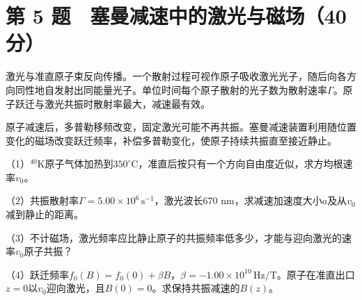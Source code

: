 \documentclass[12pt,a4paper,fontset=fandol]{ctexart}
\begin{document}
\clearpage

\section{第 5
题　塞曼减速中的激光与磁场（40分）}\label{ux7b2c-5-ux9898-ux585eux66fcux51cfux901fux4e2dux7684ux6fc0ux5149ux4e0eux78c1ux573a40ux5206}

激光与准直原子束反向传播。一个散射过程可视作原子吸收激光光子，随后向各方向同性地自发射出同能量光子。单位时间每个原子散射的光子数为散射速率\(\Gamma\)。原子跃迁与激光共振时散射率最大，减速最有效。

原子减速后，多普勒移频改变，固定激光可能不再共振。塞曼减速装置利用随位置变化的磁场改变跃迁频率，补偿多普勒变化，使原子持续共振直至接近静止。

\begin{center}
\begin{minipage}{\linewidth}
\centering\begingroup{}
\ifdim\wd\diagrambox>.88\linewidth
\sbox{\diagrambox}{\resizebox{.88\linewidth}{!}{\usebox{\diagrambox}}}\fi
\ifdim\ht\diagrambox>.38\textheight
\resizebox{!}{.38\textheight}{\usebox{\diagrambox}}
\else\usebox{\diagrambox}\fi
\par{}\endgroup\end{minipage}\end{center}

（1）\(^{40}\mathrm K\)原子气体加热到\(350^\circ\)C，准直后按只有一个方向自由度近似，求方均根速率\(v_0\)。

（2）共振散射率\(\Gamma=5.00\times10^6\,\mathrm{s^{-1}}\)，激光波长670
nm，求减速加速度大小\(a\)及从\(v_0\)减到静止的距离。

（3）不计磁场，激光频率应比静止原子的共振频率低多少，才能与迎向激光的速率\(v_0\)原子共振？

（4）跃迁频率\(f_0(B)=f_0(0)+\beta B\)，\(\beta=-1.00\times10^{10}\,\mathrm{Hz/T}\)。原子在准直出口\(z=0\)以\(v_0\)迎向激光，且\(B(0)=0\)。求保持共振减速的\(B(z)\)。
\end{document}
